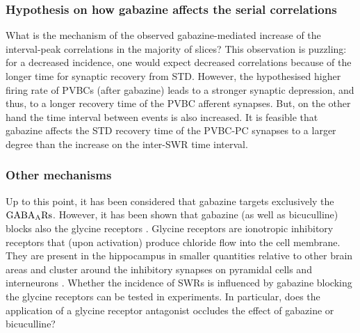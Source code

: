     \subsubsection{Hypothesis on how gabazine affects the serial correlations} 
      What is the mechanism of the observed gabazine-mediated increase of the
      interval-peak correlations in the majority of slices? This observation is
      puzzling: for a decreased incidence, one would expect decreased
      correlations because of the longer time for synaptic recovery from STD.
      However, the hypothesised higher firing rate of PVBCs (after gabazine)
      leads to a stronger synaptic depression, and thus, to a longer recovery
      time of the PVBC afferent synapses. But, on the other hand the time
      interval between events is also increased. It is feasible that gabazine
      affects the STD recovery time of the PVBC-PC synapses to a larger
      degree than the increase on the inter-SWR time interval.
      

    \subsubsection{Other mechanisms} 
      Up to this point, it has been considered that gabazine targets
      exclusively the $\rm GABA_ARs$. However, it has been shown that gabazine
      (as well as bicuculline) blocks also the glycine receptors
      \citep{Wang2005, Li2007}. Glycine receptors are ionotropic inhibitory
      receptors that (upon activation) produce chloride flow into the cell
      membrane. They are present in the hippocampus in smaller quantities
      relative to other brain areas \citep{denPol1988} and cluster around the
      inhibitory synapses on pyramidal cells and interneurons \citep{Levi2004}.
      Whether the incidence of SWRs is influenced by gabazine blocking the
      glycine receptors can be tested in experiments. In particular, does the
      application of a glycine receptor antagonist occludes the effect of
      gabazine or bicuculline?

